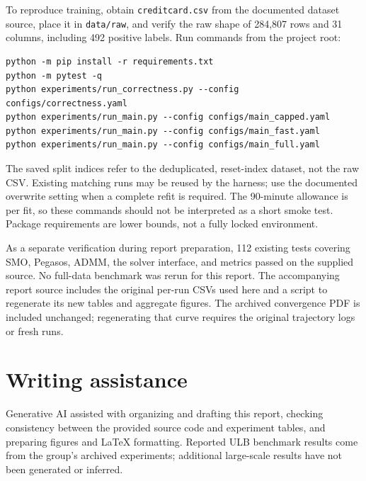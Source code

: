 \documentclass{article}
\begin{document}
To reproduce training, obtain \texttt{creditcard.csv} from the documented dataset source, place it in \texttt{data/raw}, and verify the raw shape of 284,807 rows and 31 columns, including 492 positive labels. Run commands from the project root:
\begin{Verbatim}[fontsize=\small]
python -m pip install -r requirements.txt
python -m pytest -q
python experiments/run_correctness.py --config configs/correctness.yaml
python experiments/run_main.py --config configs/main_capped.yaml
python experiments/run_main.py --config configs/main_fast.yaml
python experiments/run_main.py --config configs/main_full.yaml
\end{Verbatim}
The saved split indices refer to the deduplicated, reset-index dataset, not the raw CSV. Existing matching runs may be reused by the harness; use the documented overwrite setting when a complete refit is required. The 90-minute allowance is per fit, so these commands should not be interpreted as a short smoke test. Package requirements are lower bounds, not a fully locked environment.

As a separate verification during report preparation, 112 existing tests covering SMO, Pegasos, ADMM, the solver interface, and metrics passed on the supplied source. No full-data benchmark was rerun for this report. The accompanying report source includes the original per-run CSVs used here and a script to regenerate its new tables and aggregate figures. The archived convergence PDF is included unchanged; regenerating that curve requires the original trajectory logs or fresh runs.

\section*{Writing assistance}
Generative AI assisted with organizing and drafting this report, checking consistency between the provided source code and experiment tables, and preparing figures and \LaTeX{} formatting. Reported ULB benchmark results come from the group's archived experiments; additional large-scale results have not been generated or inferred.
\end{document}
